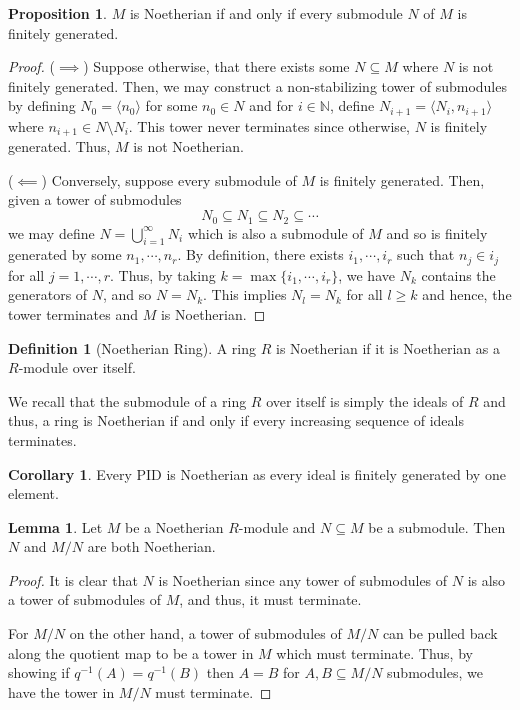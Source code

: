 \documentclass[]{article}
\theoremstyle{definition}
\newtheorem{corollary}{Corollary}[theorem]
\theoremstyle{definition}
\newtheorem{definition}{Definition}[section]
\newtheorem{lemma}{Lemma}[section]
\newtheorem{proposition}{Proposition}[section]
\begin{document}
\begin{proposition}
  \(M\) is Noetherian if and only if every submodule \(N\) of \(M\) is finitely 
  generated.
\end{proposition}
\begin{proof}
  (\(\implies\)) Suppose otherwise, that there exists some \(N \subseteq M\) 
  where \(N\) is not finitely generated. Then, we may construct a non-stabilizing 
  tower of submodules by defining \(N_0 = \langle n_0 \rangle\) for some 
  \(n_0 \in N\) and for \(i \in \mathbb{N}\), define \(N_{i + 1} = 
  \langle N_i, n_{i + 1}\rangle\) where \(n_{i + 1} \in N \setminus N_i\). This 
  tower never terminates since otherwise, \(N\) is finitely generated. Thus, 
  \(M\) is not Noetherian.

  (\(\impliedby\)) Conversely, suppose every submodule of \(M\) is finitely 
  generated. Then, given a tower of submodules 
  \[N_0 \subseteq N_1 \subseteq N_2 \subseteq \cdots\]
  we may define \(N = \bigcup_{i = 1}^\infty N_i\) which is also a submodule of 
  \(M\) and so is finitely generated by some \(n_1, \cdots, n_r\). By definition, 
  there exists \(i_1, \cdots, i_r\) such that \(n_j \in i_j\) for all 
  \(j = 1, \cdots, r\). Thus, by taking \(k = \max \{i_1, \cdots, i_r\}\), 
  we have \(N_k\) contains the generators of \(N\), and so \(N = N_k\). This 
  implies \(N_l = N_k\) for all \(l \ge k\) and hence, the tower terminates 
  and \(M\) is Noetherian.
\end{proof}

\begin{definition}[Noetherian Ring]
  A ring \(R\) is Noetherian if it is Noetherian as a \(R\)-module over itself.
\end{definition}

We recall that the submodule of a ring \(R\) over itself is simply the ideals 
of \(R\) and thus, a ring is Noetherian if and only if every increasing sequence 
of ideals terminates.

\begin{corollary}
  Every PID is Noetherian as every ideal is finitely generated by one element.
\end{corollary}

\begin{lemma}
  Let \(M\) be a Noetherian \(R\)-module and \(N \subseteq M\) be a submodule.
  Then \(N\) and \(M / N\) are both Noetherian.
\end{lemma}
\begin{proof}
  It is clear that \(N\) is Noetherian since any tower of submodules of \(N\) 
  is also a tower of submodules of \(M\), and thus, it must terminate.

  For \(M / N\) on the other hand, a tower of submodules of \(M / N\) can 
  be pulled back along the quotient map to be a tower in \(M\) which must terminate.
  Thus, by showing if \(q^{-1}(A) = q^{-1}(B)\) then \(A = B\) for 
  \(A, B \subseteq M / N\) submodules, we have the tower in \(M / N\) must 
  terminate.
\end{proof}
\end{document}
